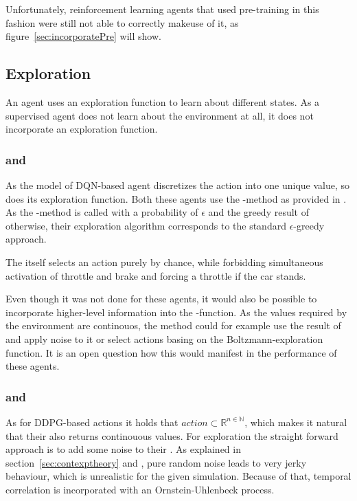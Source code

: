 Unfortunately, reinforcement learning agents that used pre-training in this fashion were still not able to correctly makeuse of it, as figure~\ref{sec:incorporatePre} will show.

\subsection{Exploration}

An agent uses an exploration function to learn about different states. As a supervised agent does not learn about the environment at all, it does not incorporate an exploration function.

\subsubsection{ and }

As the model of DQN-based agent discretizes the action into one unique value, so does its exploration function. Both these agents use the -method as provided in . As the -method is called with a probability of $\epsilon$ and the greedy result of  otherwise, their exploration algorithm corresponds to the standard $\epsilon$-greedy approach.

The  itself selects an action purely by chance, while forbidding simultaneous activation of throttle and brake and forcing a throttle if the car stands.

Even though it was not done for these agents, it would also be possible to incorporate higher-level information into the -function. As the values required by the environment are continouos, the method could for example use the result of  and apply noise to it or select actions basing on the Boltzmann-exploration function. It is an open question how this would manifest in the performance of these agents.

\subsubsection{ and }

As for DDPG-based actions it holds that $action \subset \mathds{R}^{n \in \mathds{N}}$, which makes it natural that their  also returns continouous values. For exploration the straight forward approach is to add some noise to their . As explained in section~\ref{sec:contexptheory} and \cite{wawrzynski_control_2015}, pure random noise leads to very jerky behaviour, which is unrealistic for the given simulation. Because of that, temporal correlation is incorporated with an  Ornstein-Uhlenbeck process.

